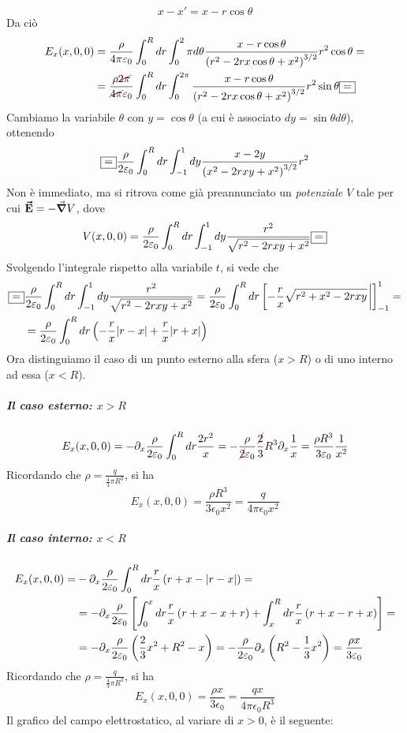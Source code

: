 \begin{equation*}
	x-x'=x-r\cos\theta
\end{equation*}
Da ciò 
\begin{align*}
	E_x(x,0,0)&=\frac{\rho}{4\pi\epsilon_0}\int_0^Rdr\int_0^2\pi d\theta \frac{x-r\cos\theta}{\left(r^2-2rx\cos\theta+x^2\right)^{3/2}}r^2\cos\theta=\\
	&=\frac{\rho \Ccancel[red]{2\pi}}{\Ccancel[red]{4\pi}\epsilon_0}\int_0^Rdr\int_{0}^{2\pi}\frac{x-r\cos\theta}{\left(r^2-2rx\cos\theta+x^2\right)^{3/2}}r^2\sin\theta\squarequal
\end{align*}
Cambiamo la variabile $\theta$ con $y=\cos\theta$ (a cui è associato $dy=\sin\theta d\theta$), ottenendo
\begin{equation*}
	\squarequal\frac{\rho}{2\epsilon_0}\int_0^Rdr\int_{-1}^{1}dy\frac{x-2y}{\left(x^2-2rxy+x^2\right)^{3/2}}r^2
\end{equation*}
Non è immediato, ma si ritrova come già preannunciato un \textit{potenziale} $V$ tale per cui $\vb*{\va{E}}=-\grad{V}$, dove
\begin{equation*}
	V(x,0,0)=\frac{\rho}{2\epsilon_0}\int_{0}^Rdr\int_{-1}^{1}dy\frac{r^2}{\sqrt{r^2-2rxy+x^2}}\squarequal
\end{equation*}
Svolgendo l'integrale rispetto alla variabile $t$, si vede che
\begin{align*}
	\squarequal&\frac{\rho}{2\epsilon_0}\int_{0}^Rdr\int_{-1}^{1}dy\frac{r^2}{\sqrt{r^2-2rxy+x^2}}=\frac{\rho}{2\epsilon_0}\int_{0}^Rdr\left[-\frac{r}{x}\sqrt{r^2+x^2-2rxy}\eval\right]_{-1}^{1}=\\
	&=\frac{\rho}{2\epsilon_0}\int_{0}^Rdr\left(-\frac{r}{x}\abs{r-x}+\frac{r}{x}\abs{r+x}\right)
\end{align*}
Ora distinguiamo il caso di un punto esterno alla sfera ($x>R$) o di uno interno ad essa ($x<R$).
\subparagraph{Il caso esterno: $x>R$}
\begin{equation*}
	E_x(x,0,0)=-\partial_x\frac{\rho}{2\epsilon_0}\int_0^Rdr\frac{2r^2}{x}=-\frac{\rho}{\Ccancel[red]{2}\epsilon_0}\frac{\Ccancel[red]{2}}{3}R^3\partial_x \frac{1}{x}=\frac{\rho R^3}{3\epsilon_0}\frac{1}{x^2}
\end{equation*}
Ricordando che $\rho=\frac{q}{\frac{4}{3}\pi R^3}$, si ha
\begin{equation}
	E_x(x,0,0)=\frac{\rho R^3}{3\epsilon_0x^2}=\frac{q}{4\pi\epsilon_0x^2}
\end{equation}
\subparagraph{Il caso interno: $x<R$}
\begin{align*}
 E_x(x,0,0)=&-\partial_x\frac{\rho}{2\varepsilon_0}\int_0^Rdr\frac{r}{x}\left(r+x-\abs{r-x}\right)=\\
 &=-\partial_x\frac{\rho}{2\varepsilon_0}\left[\int_0^xdr\frac{r}{x}\left(r+x-x+r\right)+\int_x^Rdr\frac{r}{x}\left(r+x-r+x\right)\right]=\\
 &=-\partial_x\frac{\rho}{2\varepsilon_0}\left(\frac{2}{3}x^2+R^2-x\right)=-\frac{\rho}{2\varepsilon_0}\partial_x\left(R^2-\frac{1}{3}x^2\right)=\frac{\rho x}{3\varepsilon_0}
\end{align*}
Ricordando che $\rho=\frac{q}{\frac{4}{3}\pi R^3}$, si ha
\begin{equation}
	E_x(x,0,0)=\frac{\rho x}{3\epsilon_0}=\frac{qx}{4\pi\epsilon_0R^3}
\end{equation}
Il grafico del campo elettrostatico, al variare di $x>0$, è il seguente:
